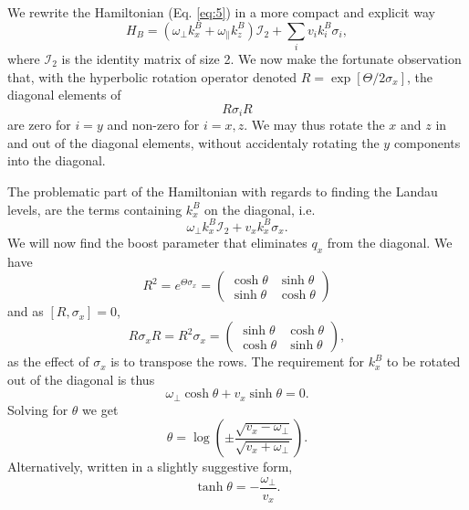 We rewrite the Hamiltonian (Eq. \eqref{eq:5}) in a more compact and explicit way
\begin{equation}
  \label{eq:8}
  H_{B} = \left(\omega _{\perp} k^B_{x} + \omega _{\parallel} k^B_{z} \right) \mathcal{I}_2 + \sum_i v_{i} k^B_{i} \sigma _{i},
\end{equation}
where \(\mathcal{I}_{2}\) is the identity matrix of size 2.
We now make the fortunate observation that, with the hyperbolic rotation operator denoted \( R = \exp [\Theta / 2 \sigma_{x}]\), the diagonal elements of
\[
R \sigma_{i} R
\]
are zero for $i=y$ and non-zero for \(i=x,z\).
We may thus rotate the \(x\) and \(z\) in and out of the diagonal elements, without accidentaly rotating the \(y\) components into the diagonal.

The problematic part of the Hamiltonian with regards to finding the Landau levels, are the terms containing \(k^B_{x}\) on the diagonal, i.e.
\[
  \omega _{\perp} k^B_{x} \mathcal{I}_{2} + v_{x} k^B_{x} \sigma _{x}.
\]
We will now find the boost parameter that eliminates \(q_{x}\) from the diagonal.
We have
\begin{equation}
  \label{eq:9}
  R^{2} = e^{\Theta \sigma _{x} } =
  \begin{pmatrix}
    \cosh \theta & \sinh \theta \\
    \sinh \theta & \cosh \theta
  \end{pmatrix}
\end{equation}
and as $[R, \sigma_{x}] = 0$,
\begin{equation}
  \label{eq:10}
  R \sigma _{x} R =  R^{2} \sigma _{x} =
  \begin{pmatrix}
    \sinh \theta & \cosh \theta \\
    \cosh \theta & \sinh \theta
  \end{pmatrix},
\end{equation}
as the effect of \(\sigma _{x}\) is to transpose the rows.
The requirement for \(k^B_{x}\) to be rotated out of the diagonal is thus
\begin{equation}
  \label{eq:11}
  \omega _{\perp} \cosh \theta + v_{x} \sinh \theta = 0.
\end{equation}
Solving for \(\theta \) we get
\begin{equation}
  \label{eq:12}
  \theta = \log (
  \pm \frac{\sqrt{v_{x} - \omega _{\perp}}}{\sqrt{v_{x} + \omega _{\perp}}}
  ).
\end{equation}
Alternatively, written in a slightly suggestive form,
\begin{equation}
  \label{eq:13}
  \tanh \theta =
  - \frac{\omega _{\perp}}{v_{x}}.
\end{equation}

